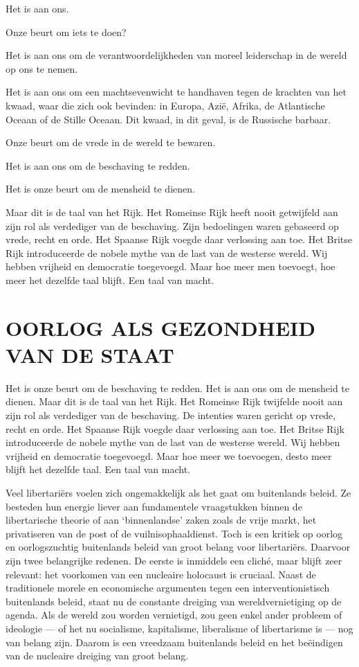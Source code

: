 \documentclass[
  a5paper,
  smalldemyvopaper,10pt,twoside,onecolumn,openright,extrafontsizes,hidelinks]{memoir}
\renewenvironment{quote}%
               {\list{}{\rightmargin=.6cm\leftmargin=.6cm}%
                \itshape \item[]}%
               {\endlist}
\begin{document}
\begin{quote}
Het is aan ons.

Onze beurt om iets te doen?

Het is aan ons om de verantwoordelijkheden van moreel leiderschap in de
wereld op ons te nemen.

Het is aan ons om een machtsevenwicht te handhaven tegen de krachten van
het kwaad, waar die zich ook bevinden: in Europa, Azië, Afrika, de
Atlantische Oceaan of de Stille Oceaan. Dit kwaad, in dit geval, is de
Russische barbaar.

Onze beurt om de vrede in de wereld te bewaren.

Het is aan ons om de beschaving te redden.

Het is onze beurt om de mensheid te dienen.

Maar dit is de taal van het Rijk. Het Romeinse Rijk heeft nooit
getwijfeld aan zijn rol als verdediger van de beschaving. Zijn
bedoelingen waren gebaseerd op vrede, recht en orde. Het Spaanse Rijk
voegde daar verlossing aan toe. Het Britse Rijk introduceerde de nobele
mythe van de last van de westerse wereld. Wij hebben vrijheid en
democratie toegevoegd. Maar hoe meer men toevoegt, hoe meer het dezelfde
taal blijft. Een taal van macht.
\end{quote}

\section{OORLOG ALS GEZONDHEID VAN DE
STAAT}\label{oorlog-als-gezondheid-van-de-staat}

Het is onze beurt om de beschaving te redden. Het is aan ons om de
mensheid te dienen. Maar dit is de taal van het Rijk. Het Romeinse Rijk
twijfelde nooit aan zijn rol als verdediger van de beschaving. De
intenties waren gericht op vrede, recht en orde. Het Spaanse Rijk voegde
daar verlossing aan toe. Het Britse Rijk introduceerde de nobele mythe
van de last van de westerse wereld. Wij hebben vrijheid en democratie
toegevoegd. Maar hoe meer we toevoegen, desto meer blijft het dezelfde
taal. Een taal van macht.

Veel libertariërs voelen zich ongemakkelijk als het gaat om buitenlands
beleid. Ze besteden hun energie liever aan fundamentele vraagstukken
binnen de libertarische theorie of aan `binnenlandse' zaken zoals de
vrije markt, het privatiseren van de post of de vuilnisophaaldienst.
Toch is een kritiek op oorlog en oorlogszuchtig buitenlands beleid van
groot belang voor libertariërs. Daarvoor zijn twee belangrijke redenen.
De eerste is inmiddels een cliché, maar blijft zeer relevant: het
voorkomen van een nucleaire holocaust is cruciaal. Naast de traditionele
morele en economische argumenten tegen een interventionistisch
buitenlands beleid, staat nu de constante dreiging van
wereldvernietiging op de agenda. Als de wereld zou worden vernietigd,
zou geen enkel ander probleem of ideologie --- of het nu socialisme,
kapitalisme, liberalisme of libertarisme is --- nog van belang zijn.
Daarom is een vreedzaam buitenlands beleid en het beëindigen van de
nucleaire dreiging van groot belang.
\end{document}
